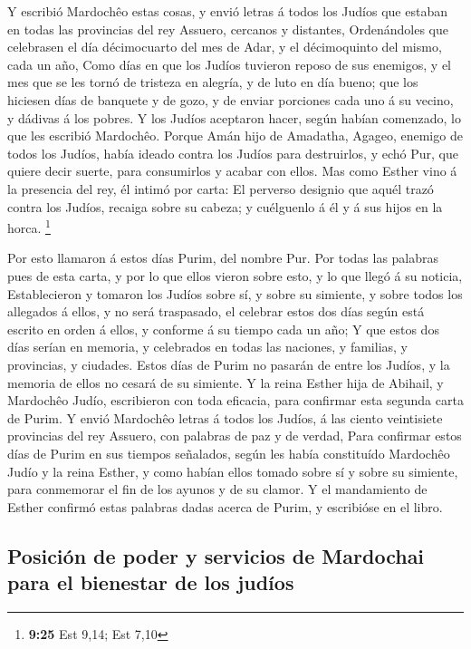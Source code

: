  Y escribió Mardochêo estas cosas, y envió letras á todos
los Judíos que estaban en todas las provincias del rey Assuero, cercanos
y distantes,  Ordenándoles que celebrasen el día
décimocuarto del mes de Adar, y el décimoquinto del mismo, cada un año,
 Como días en que los Judíos tuvieron reposo de sus
enemigos, y el mes que se les tornó de tristeza en alegría, y de luto en
día bueno; que los hiciesen días de banquete y de gozo, y de enviar
porciones cada uno á su vecino, y dádivas á los pobres.  Y
los Judíos aceptaron hacer, según habían comenzado, lo que les escribió
Mardochêo.  Porque Amán hijo de Amadatha, Agageo, enemigo
de todos los Judíos, había ideado contra los Judíos para destruirlos, y
echó Pur, que quiere decir suerte, para consumirlos y acabar con ellos.
 Mas como Esther vino á la presencia del rey, él intimó por
carta: El perverso designio que aquél trazó contra los Judíos, recaiga
sobre su cabeza; y cuélguenlo á él y á sus hijos en la horca.
\footnote{\textbf{9:25} Est 9,14; Est 7,10}

 Por esto llamaron á estos días Purim, del nombre Pur. Por
todas las palabras pues de esta carta, y por lo que ellos vieron sobre
esto, y lo que llegó á su noticia,  Establecieron y tomaron
los Judíos sobre sí, y sobre su simiente, y sobre todos los allegados á
ellos, y no será traspasado, el celebrar estos dos días según está
escrito en orden á ellos, y conforme á su tiempo cada un año;
 Y que estos dos días serían en memoria, y celebrados en
todas las naciones, y familias, y provincias, y ciudades. Estos días de
Purim no pasarán de entre los Judíos, y la memoria de ellos no cesará de
su simiente.  Y la reina Esther hija de Abihail, y
Mardochêo Judío, escribieron con toda eficacia, para confirmar esta
segunda carta de Purim.  Y envió Mardochêo letras á todos
los Judíos, á las ciento veintisiete provincias del rey Assuero, con
palabras de paz y de verdad,  Para confirmar estos días de
Purim en sus tiempos señalados, según les había constituído Mardochêo
Judío y la reina Esther, y como habían ellos tomado sobre sí y sobre su
simiente, para conmemorar el fin de los ayunos y de su clamor.
 Y el mandamiento de Esther confirmó estas palabras dadas
acerca de Purim, y escribióse en el libro.

\hypertarget{posiciuxf3n-de-poder-y-servicios-de-mardochai-para-el-bienestar-de-los-juduxedos}{%
\subsection{Posición de poder y servicios de Mardochai para el bienestar
de los
judíos}\label{posiciuxf3n-de-poder-y-servicios-de-mardochai-para-el-bienestar-de-los-juduxedos}}

